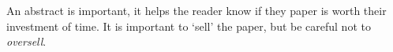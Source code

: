 An abstract is important, it helps the reader know if they paper is worth their investment of time.
It is important to `sell' the paper, but be careful not to \emph{oversell}.
